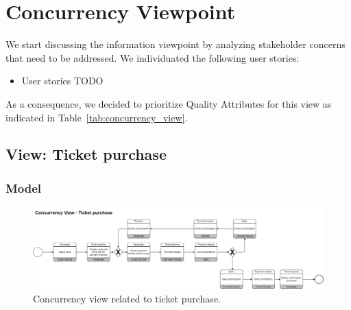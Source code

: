 \section{Concurrency Viewpoint}
We start discussing the information viewpoint by analyzing stakeholder concerns that need to be addressed.
We individuated the following user stories:
\begin{itemize}
    \item User stories TODO
\end{itemize}

As a consequence, we decided to prioritize Quality Attributes for this view as indicated in Table~\ref{tab:concurrency_view}.
\begin{table}[h!]
    \centering
    \caption{Concurrency View Prioritized Quality Attributes}
    \label{tab:concurrency_view}
\end{table}

\subsection{View: Ticket purchase}
\subsubsection{Model}

\begin{figure}[H]
    \centering
    \includegraphics[width=\textwidth]{drawings/views_final_version/concurrency_view_1.png}
    \caption{Concurrency view related to ticket purchase.}
    \label{fig:concurrency_view_1}
\end{figure}

